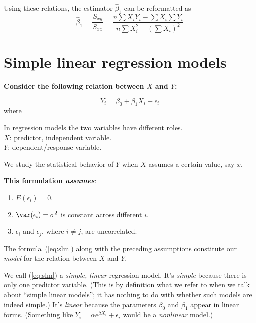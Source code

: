\documentclass[12pt]{article}
\begin{document}
Using these relations, the estimator $\hat\beta_1$ can be reformatted as
\[
\hat\beta_1
= \frac{S_{xy}}{S_{xx}}
= \frac{n\sum X_iY_i - \sum X_i \sum Y_i}{n\sum X_i^2 - (\sum X_i)^2}
\]


\section{Simple linear regression models}

\textbf{Consider the following relation between $X$ and $Y$:}

\begin{equation}\label{eq:slm}
Y_i = \beta_0 + \beta_1 X_i + \epsilon_i
\end{equation}
where


In regression models the two variables have different roles.\\
$X$: predictor, independent variable.\\
$Y$: dependent/response variable.

We study the statistical behavior of $Y$ when $X$ assumes a
certain value, say $x$.

\textbf{This formulation \emph{assumes}}:

\begin{enumerate}
\item $E(\epsilon_i) = 0$.
\item $\var(\epsilon_i) = \sigma^2$ is constant across different $i$.
\item $\epsilon_i$ and $\epsilon_j$, where $i\ne j$, are uncorrelated.
\end{enumerate}

The formula~(\ref{eq:slm}) along with the preceding assumptions
constitute our \emph{model} for the relation between $X$ and $Y$.

We call (\ref{eq:slm}) a \emph{simple, linear} regression model.
It's \emph{simple} because there is only one predictor variable.
(This is by definition what we refer to when we talk about ``simple linear models'';
it has nothing to do with whether such models are indeed simple.)
It's \emph{linear} because the parameters $\beta_0$ and $\beta_1$
appear in linear forms.
(Something like
$Y_i = \alpha e^{\beta X_i} + \epsilon_i$ would be
a \emph{nonlinear} model.)
\end{document}
